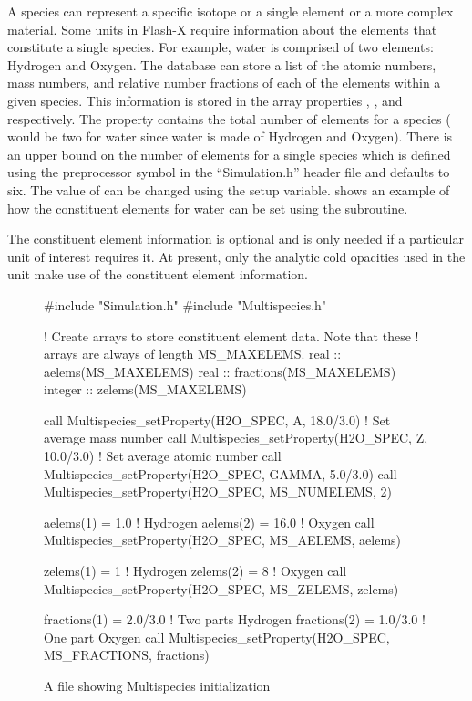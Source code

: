A species can represent a specific isotope or a single element or a more complex material. Some
units in Flash-X require information about the elements that constitute
a single species. For example, water is comprised of two elements:
Hydrogen and Oxygen. The  database can store a list
of the atomic numbers, mass numbers, and relative number fractions of
each of the elements within a given species. This information is
stored in the array properties , ,
and  respectively. The property
 contains the total number of elements for a
species ( would be two for water since water is
made of Hydrogen and Oxygen). There is an upper bound on the number of
elements for a single species which is defined using the preprocessor
symbol  in the ``Simulation.h'' header file and defaults
to six. The value of  can be changed using the
 setup variable.  shows
an example of how the constituent elements for water can be set using
the  subroutine.

The constituent element information is optional and is only needed if
a particular unit of interest requires it. At present, only the
analytic cold opacities used in the  unit make use of
the constituent element information.

\begin{figure}
\begin{shrink}
\begin{codeseg}
#include "Simulation.h"
#include "Multispecies.h"

! Create arrays to store constituent element data. Note that these
! arrays are always of length MS_MAXELEMS.
real :: aelems(MS_MAXELEMS)
real :: fractions(MS_MAXELEMS)
integer :: zelems(MS_MAXELEMS)

call Multispecies_setProperty(H2O_SPEC, A, 18.0/3.0) ! Set average mass number
call Multispecies_setProperty(H2O_SPEC, Z, 10.0/3.0) ! Set average atomic number
call Multispecies_setProperty(H2O_SPEC, GAMMA, 5.0/3.0)
call Multispecies_setProperty(H2O_SPEC, MS_NUMELEMS, 2)

aelems(1) =  1.0 ! Hydrogen
aelems(2) = 16.0 ! Oxygen
call Multispecies_setProperty(H2O_SPEC, MS_AELEMS, aelems)

zelems(1) = 1 ! Hydrogen
zelems(2) = 8 ! Oxygen
call Multispecies_setProperty(H2O_SPEC, MS_ZELEMS, zelems)  

fractions(1) = 2.0/3.0 ! Two parts Hydrogen
fractions(2) = 1.0/3.0 ! One part Oxygen
call Multispecies_setProperty(H2O_SPEC, MS_FRACTIONS, fractions)
\end{codeseg}
\end{shrink}
\caption{A  file showing Multispecies initialization}
\label{Fig:MultispeciesElems}
\end{figure}


